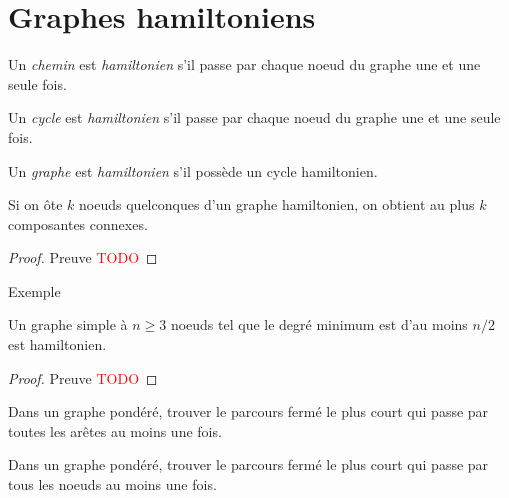 \section{Graphes hamiltoniens}
\begin{mydef}
  Un \emph{chemin} est \emph{hamiltonien} s’il passe par chaque noeud du graphe une et une seule fois.
\end{mydef}

\begin{mydef}
  Un \emph{cycle} est \emph{hamiltonien} s’il passe par chaque noeud du graphe une et une seule fois.
\end{mydef}

\begin{mydef}
  Un \emph{graphe} est \emph{hamiltonien} s’il possède un cycle hamiltonien.
\end{mydef}

\begin{mytheo} 
  Si on ôte $k$ noeuds quelconques d’un graphe hamiltonien, on obtient au plus $k$ composantes connexes.
  \begin{proof}
     Preuve  \textcolor{red}{TODO}
  \end{proof}
\end{mytheo}
\begin{myexem}
  Exemple
\end{myexem}

\begin{mytheo} 
  Un graphe simple à $n \geq 3$ noeuds tel que le degré minimum est d’au moins $n/2$ est hamiltonien.
  \begin{proof}
     Preuve  \textcolor{red}{TODO}
  \end{proof}
\end{mytheo}

\begin{mydef} 
  Dans un graphe pondéré, trouver le parcours fermé le plus court qui passe par toutes les arêtes au moins une fois.
\end{mydef}

\begin{mydef} 
  Dans un graphe pondéré, trouver le parcours fermé le plus court qui passe par tous les noeuds au moins une fois.
\end{mydef}
